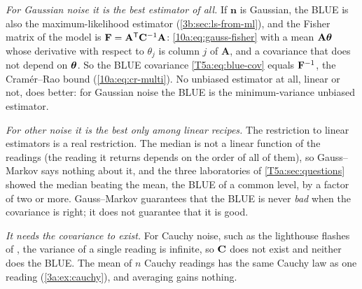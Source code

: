 \emph{For Gaussian noise it is the best estimator of all.} If $\bm n$ is
Gaussian, the BLUE is also the maximum-likelihood estimator
(\cref{3b:sec:ls-from-ml}), and the Fisher matrix of the model is
$\mathbf{F}=\mathbf A^{\mathsf{T}}\mathbf{C}^{-1}\mathbf A$: \cref{10a:eq:gauss-fisher} with a mean
$\mathbf A\bm{\theta}$ whose derivative with respect to $\theta_j$ is column $j$
of $\mathbf A$, and a covariance that does not depend on $\bm{\theta}$. So the
BLUE covariance \eqref{T5a:eq:blue-cov} equals $\mathbf{F}^{-1}$, the Cram\'er--Rao
bound (\cref{10a:eq:cr-multi}). No unbiased estimator at all, linear or not,
does better: for Gaussian noise the BLUE is the minimum-variance unbiased
estimator.

\emph{For other noise it is the best only among linear recipes.} The
restriction to linear estimators is a real restriction. The median is not a
linear function of the readings (the reading it returns depends on the
order of all of them), so Gauss--Markov says nothing about it, and the three
laboratories of \cref{T5a:sec:questions} showed the median beating the mean,
the BLUE of a common level, by a factor of two or more. Gauss--Markov
guarantees that the BLUE is never \emph{bad} when the covariance is right;
it does not guarantee that it is good.

\emph{It needs the covariance to exist.} For Cauchy noise, such as the
lighthouse flashes of , the variance of a single reading
is infinite, so $\mathbf{C}$ does not exist and neither does the BLUE. The mean
of $n$ Cauchy readings has the same Cauchy law as one reading
(\cref{3a:ex:cauchy}), and averaging gains nothing.


